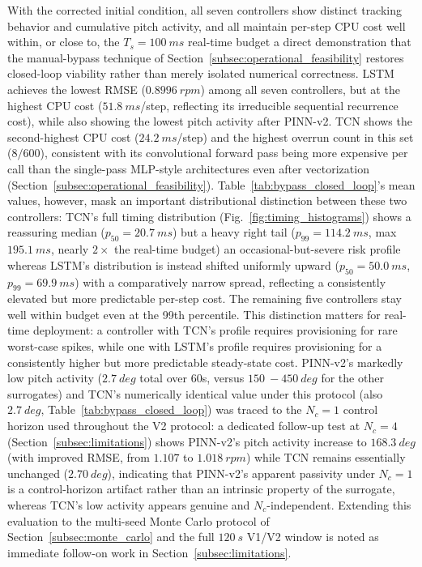 With the corrected initial condition, all seven controllers show
distinct tracking behavior and cumulative pitch activity, and all
maintain per-step CPU cost well within, or close to, the
$T_s=\SI{100}{ms}$ real-time budget  a direct demonstration that the
manual-bypass technique of Section~\ref{subsec:operational_feasibility}
restores closed-loop viability rather than merely isolated numerical
correctness. LSTM achieves the lowest RMSE ($\SI{0.8996}{rpm}$) among
all seven controllers, but at the highest CPU cost
($\SI{51.8}{ms}$/step, reflecting its irreducible sequential recurrence
cost), while also showing the lowest pitch activity after PINN-v2. TCN
shows the second-highest CPU cost ($\SI{24.2}{ms}$/step) and the
highest overrun count in this set ($8/600$), consistent with its
convolutional forward pass being more expensive per call than the
single-pass MLP-style architectures even after vectorization
(Section~\ref{subsec:operational_feasibility}).
Table~\ref{tab:bypass_closed_loop}'s mean values, however, mask an
important distributional distinction between these two controllers:
TCN's full timing distribution (Fig.~\ref{fig:timing_histograms}) shows
a reassuring median ($p_{50}=\SI{20.7}{ms}$) but a heavy right tail
($p_{99}=\SI{114.2}{ms}$, max $\SI{195.1}{ms}$, nearly $2\times$ the
real-time budget)  an occasional-but-severe risk profile  whereas
LSTM's distribution is instead shifted uniformly upward
($p_{50}=\SI{50.0}{ms}$, $p_{99}=\SI{69.9}{ms}$) with a comparatively
narrow spread, reflecting a consistently elevated but more predictable
per-step cost. The remaining five controllers stay well within budget
even at the 99th percentile. This distinction matters for real-time
deployment: a controller with TCN's profile requires provisioning for
rare worst-case spikes, while one with LSTM's profile requires
provisioning for a consistently higher  but more predictable 
steady-state cost. PINN-v2's markedly low
pitch activity ($\SI{2.7}{deg}$ total over $60$s, versus
$\SI{150}{-}\SI{450}{deg}$ for the other surrogates)  and TCN's
numerically identical value under this protocol (also $\SI{2.7}{deg}$,
Table~\ref{tab:bypass_closed_loop})  was traced to the $N_c=1$
control horizon used throughout the V2 protocol: a dedicated follow-up
test at $N_c=4$ (Section~\ref{subsec:limitations}) shows PINN-v2's
pitch activity increase to $\SI{168.3}{deg}$ (with improved RMSE, from
$1.107$ to $\SI{1.018}{rpm}$) while TCN remains essentially unchanged
($\SI{2.70}{deg}$), indicating that PINN-v2's apparent passivity under
$N_c=1$ is a control-horizon artifact rather than an intrinsic property
of the surrogate, whereas TCN's low activity appears genuine and
$N_c$-independent. Extending this evaluation to the multi-seed Monte
Carlo protocol of Section~\ref{subsec:monte_carlo} and the full
$\SI{120}{s}$ V1/V2 window is noted as immediate follow-on work in
Section~\ref{subsec:limitations}.

